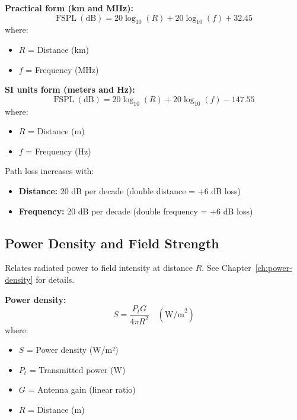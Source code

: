\textbf{Practical form (km and MHz):}
\begin{equation}
\text{FSPL}\ (\text{dB}) = 20\log_{10}(R) + 20\log_{10}(f) + 32.45
\label{eq:fspl-km-mhz}
\end{equation}
where:
\begin{itemize}
\item $R$ = Distance (km)
\item $f$ = Frequency (MHz)
\end{itemize}

\textbf{SI units form (meters and Hz):}
\begin{equation}
\text{FSPL}\ (\text{dB}) = 20\log_{10}(R) + 20\log_{10}(f) - 147.55
\label{eq:fspl-m-hz}
\end{equation}
where:
\begin{itemize}
\item $R$ = Distance (m)
\item $f$ = Frequency (Hz)
\end{itemize}

\begin{keyconcept}
Path loss increases with:
\begin{itemize}
\item \textbf{Distance:} 20 dB per decade (double distance = +6 dB loss)
\item \textbf{Frequency:} 20 dB per decade (double frequency = +6 dB loss)
\end{itemize}
\end{keyconcept}

\subsection{Power Density and Field Strength}
\label{sec:power-density}

Relates radiated power to field intensity at distance $R$. See Chapter~\ref{ch:power-density} for details.

\textbf{Power density:}
\begin{equation}
S = \frac{P_t G}{4\pi R^2} \quad (\text{W/m}^2)
\label{eq:power-density}
\end{equation}
where:
\begin{itemize}
\item $S$ = Power density (W/m²)
\item $P_t$ = Transmitted power (W)
\item $G$ = Antenna gain (linear ratio)
\item $R$ = Distance (m)
\end{itemize}

